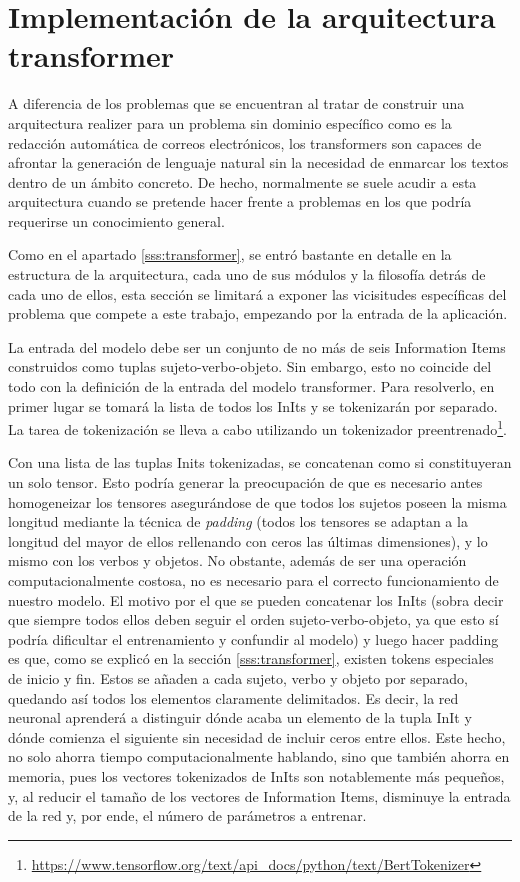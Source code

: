 \section{Implementación de la arquitectura transformer}\label{s:transformer}

A diferencia de los problemas que se encuentran al tratar de construir una arquitectura realizer para un problema sin dominio específico como es la redacción automática de correos electrónicos, los transformers son capaces de afrontar la generación de lenguaje natural sin la necesidad de enmarcar los textos dentro de un ámbito concreto. De hecho, normalmente se suele acudir a esta arquitectura cuando se pretende hacer frente a problemas en los que podría requerirse un conocimiento general.

Como en el apartado \ref{sss:transformer}, se entró bastante en detalle en la estructura de la arquitectura, cada uno de sus módulos y la filosofía detrás de cada uno de ellos, esta sección se limitará a exponer las vicisitudes específicas del problema que compete a este trabajo, empezando por la entrada de la aplicación.

La entrada del modelo debe ser un conjunto de no más de seis Information Items construidos como tuplas sujeto-verbo-objeto. Sin embargo, esto no coincide del todo con la definición de la entrada del modelo transformer. Para resolverlo, en primer lugar se tomará la lista de todos los InIts y se tokenizarán por separado. La tarea de tokenización se lleva a cabo utilizando un tokenizador preentrenado\footnote{\url{https://www.tensorflow.org/text/api_docs/python/text/BertTokenizer}}.

Con una lista de las tuplas Inits tokenizadas, se concatenan como si constituyeran un solo tensor. Esto podría generar la preocupación de que es necesario antes homogeneizar los tensores asegurándose de que todos los sujetos poseen la misma longitud mediante la técnica de \textit{padding} (todos los tensores se adaptan a la longitud del mayor de ellos rellenando con ceros las últimas dimensiones), y lo mismo con los verbos y objetos. No obstante, además de ser una operación computacionalmente costosa, no es necesario para el correcto funcionamiento de nuestro modelo. El motivo por el que se pueden concatenar los InIts (sobra decir que siempre todos ellos deben seguir el orden sujeto-verbo-objeto, ya que esto sí podría dificultar el entrenamiento y confundir al modelo) y luego hacer padding es que, como se explicó en la sección \ref{sss:transformer}, existen tokens especiales de inicio y fin. Estos se añaden a cada sujeto, verbo y objeto por separado, quedando así todos los elementos claramente delimitados. Es decir, la red neuronal aprenderá a distinguir dónde acaba un elemento de la tupla InIt y dónde comienza el siguiente sin necesidad de incluir ceros entre ellos. Este hecho, no solo ahorra tiempo computacionalmente hablando, sino que también ahorra en memoria, pues los vectores tokenizados de InIts son notablemente más pequeños, y, al reducir el tamaño de los vectores de Information Items, disminuye la entrada de la red y, por ende, el número de parámetros a entrenar.

